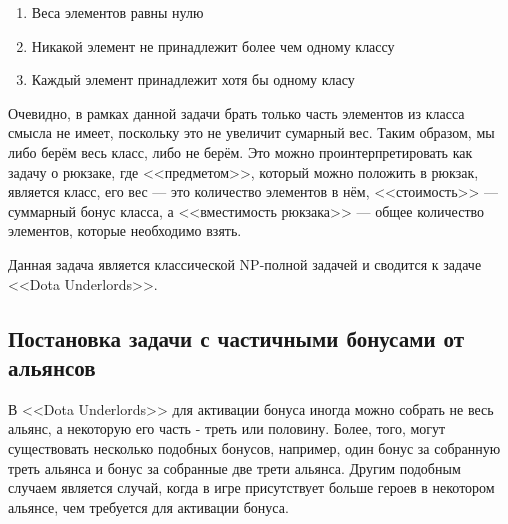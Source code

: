\documentclass{article}
\begin{document}
\begin{enumerate}
    \item Веса элементов равны нулю
    \item Никакой элемент не принадлежит более чем одному классу
    \item Каждый элемент принадлежит хотя бы одному класу
\end{enumerate}

Очевидно, в рамках данной задачи брать только часть элементов из класса смысла не имеет, поскольку это не увеличит сумарный вес. Таким образом, мы либо берём весь класс, либо не берём. Это можно проинтерпретировать как задачу о рюкзаке, где <<предметом>>, который можно положить в рюкзак, является класс, его вес --- это количество элементов в нём, <<стоимость>> --- суммарный бонус класса, а <<вместимость рюкзака>> --- общее количество элементов, которые необходимо взять.

Данная задача является классической NP-полной задачей и сводится к задаче <<Dota Underlords>>.

\subsection{Постановка задачи с частичными бонусами от альянсов}

В <<Dota Underlords>> для активации бонуса иногда можно собрать не весь альянс, а некоторую его часть - треть или половину. Более, того, могут существовать несколько подобных бонусов, например, один бонус за собранную треть альянса и бонус за собранные две трети альянса. Другим подобным случаем является случай, когда в игре присутствует больше героев в некотором альянсе, чем требуется для активации бонуса. 
\end{document}

